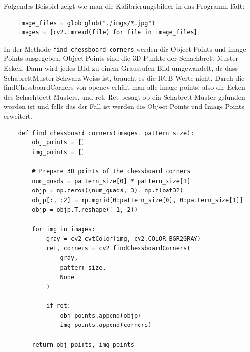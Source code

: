 Folgendes Beispiel zeigt wie man die Kalibrierungsbilder in das Programm lädt:


\begin{lstlisting}
    image_files = glob.glob("./imgs/*.jpg")
    images = [cv2.imread(file) for file in image_files]
\end{lstlisting}


In der Methode \texttt{find\_chessboard\_corners} werden die Object Points und image Points ausgegeben. Object Points sind die 3D Punkte der Schachbrett-Muster Ecken.
Dann wird jedes Bild zu einem Graustufen-Bild umgewandelt, da dass SchabrettMuster Schwarz-Weiss ist, braucht es die RGB Werte nicht. 
Durch die findChessboardCorners von opencv erhält man alle image points, also die Ecken des Schachbrett-Musters, und ret. 
Ret besagt ob ein Schabrett-Muster gefunden worden ist und falls das der Fall ist werden die Object Points und Image Points erweitert. \clearpage



\begin{lstlisting}
    def find_chessboard_corners(images, pattern_size):
        obj_points = []
        img_points = []

        # Prepare 3D points of the chessboard corners
        num_quads = pattern_size[0] * pattern_size[1]
        objp = np.zeros((num_quads, 3), np.float32)
        objp[:, :2] = np.mgrid[0:pattern_size[0], 0:pattern_size[1]]
        objp = objp.T.reshape((-1, 2))

        for img in images:
            gray = cv2.cvtColor(img, cv2.COLOR_BGR2GRAY)
            ret, corners = cv2.findChessboardCorners(
                gray,
                pattern_size, 
                None
            )

            if ret:
                obj_points.append(objp)
                img_points.append(corners)

        return obj_points, img_points
\end{lstlisting}

